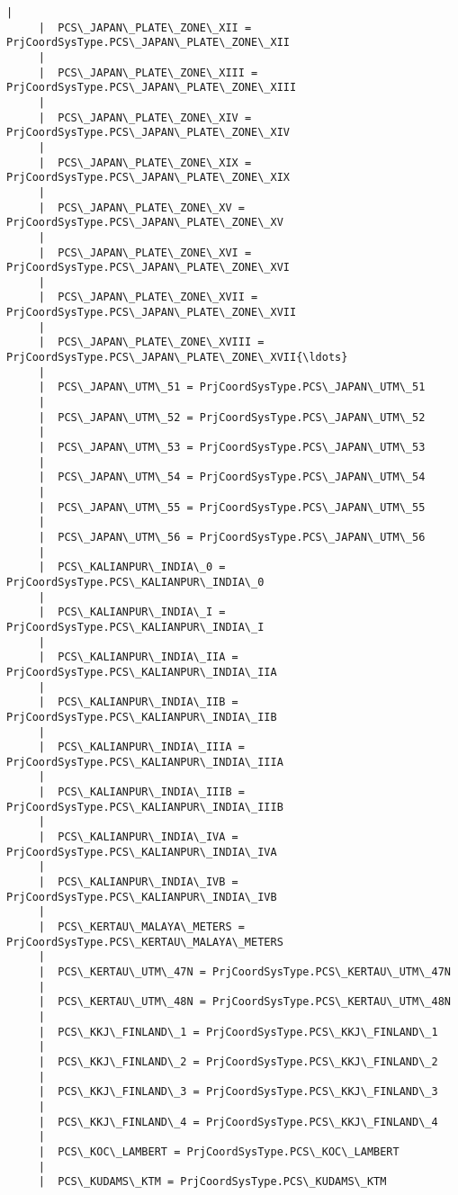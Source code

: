 \documentclass[11pt]{article}
\begin{document}
\begin{Verbatim}[commandchars=\\\{\}]
     |  
     |  PCS\_JAPAN\_PLATE\_ZONE\_XII = PrjCoordSysType.PCS\_JAPAN\_PLATE\_ZONE\_XII
     |  
     |  PCS\_JAPAN\_PLATE\_ZONE\_XIII = PrjCoordSysType.PCS\_JAPAN\_PLATE\_ZONE\_XIII
     |  
     |  PCS\_JAPAN\_PLATE\_ZONE\_XIV = PrjCoordSysType.PCS\_JAPAN\_PLATE\_ZONE\_XIV
     |  
     |  PCS\_JAPAN\_PLATE\_ZONE\_XIX = PrjCoordSysType.PCS\_JAPAN\_PLATE\_ZONE\_XIX
     |  
     |  PCS\_JAPAN\_PLATE\_ZONE\_XV = PrjCoordSysType.PCS\_JAPAN\_PLATE\_ZONE\_XV
     |  
     |  PCS\_JAPAN\_PLATE\_ZONE\_XVI = PrjCoordSysType.PCS\_JAPAN\_PLATE\_ZONE\_XVI
     |  
     |  PCS\_JAPAN\_PLATE\_ZONE\_XVII = PrjCoordSysType.PCS\_JAPAN\_PLATE\_ZONE\_XVII
     |  
     |  PCS\_JAPAN\_PLATE\_ZONE\_XVIII = PrjCoordSysType.PCS\_JAPAN\_PLATE\_ZONE\_XVII{\ldots}
     |  
     |  PCS\_JAPAN\_UTM\_51 = PrjCoordSysType.PCS\_JAPAN\_UTM\_51
     |  
     |  PCS\_JAPAN\_UTM\_52 = PrjCoordSysType.PCS\_JAPAN\_UTM\_52
     |  
     |  PCS\_JAPAN\_UTM\_53 = PrjCoordSysType.PCS\_JAPAN\_UTM\_53
     |  
     |  PCS\_JAPAN\_UTM\_54 = PrjCoordSysType.PCS\_JAPAN\_UTM\_54
     |  
     |  PCS\_JAPAN\_UTM\_55 = PrjCoordSysType.PCS\_JAPAN\_UTM\_55
     |  
     |  PCS\_JAPAN\_UTM\_56 = PrjCoordSysType.PCS\_JAPAN\_UTM\_56
     |  
     |  PCS\_KALIANPUR\_INDIA\_0 = PrjCoordSysType.PCS\_KALIANPUR\_INDIA\_0
     |  
     |  PCS\_KALIANPUR\_INDIA\_I = PrjCoordSysType.PCS\_KALIANPUR\_INDIA\_I
     |  
     |  PCS\_KALIANPUR\_INDIA\_IIA = PrjCoordSysType.PCS\_KALIANPUR\_INDIA\_IIA
     |  
     |  PCS\_KALIANPUR\_INDIA\_IIB = PrjCoordSysType.PCS\_KALIANPUR\_INDIA\_IIB
     |  
     |  PCS\_KALIANPUR\_INDIA\_IIIA = PrjCoordSysType.PCS\_KALIANPUR\_INDIA\_IIIA
     |  
     |  PCS\_KALIANPUR\_INDIA\_IIIB = PrjCoordSysType.PCS\_KALIANPUR\_INDIA\_IIIB
     |  
     |  PCS\_KALIANPUR\_INDIA\_IVA = PrjCoordSysType.PCS\_KALIANPUR\_INDIA\_IVA
     |  
     |  PCS\_KALIANPUR\_INDIA\_IVB = PrjCoordSysType.PCS\_KALIANPUR\_INDIA\_IVB
     |  
     |  PCS\_KERTAU\_MALAYA\_METERS = PrjCoordSysType.PCS\_KERTAU\_MALAYA\_METERS
     |  
     |  PCS\_KERTAU\_UTM\_47N = PrjCoordSysType.PCS\_KERTAU\_UTM\_47N
     |  
     |  PCS\_KERTAU\_UTM\_48N = PrjCoordSysType.PCS\_KERTAU\_UTM\_48N
     |  
     |  PCS\_KKJ\_FINLAND\_1 = PrjCoordSysType.PCS\_KKJ\_FINLAND\_1
     |  
     |  PCS\_KKJ\_FINLAND\_2 = PrjCoordSysType.PCS\_KKJ\_FINLAND\_2
     |  
     |  PCS\_KKJ\_FINLAND\_3 = PrjCoordSysType.PCS\_KKJ\_FINLAND\_3
     |  
     |  PCS\_KKJ\_FINLAND\_4 = PrjCoordSysType.PCS\_KKJ\_FINLAND\_4
     |  
     |  PCS\_KOC\_LAMBERT = PrjCoordSysType.PCS\_KOC\_LAMBERT
     |  
     |  PCS\_KUDAMS\_KTM = PrjCoordSysType.PCS\_KUDAMS\_KTM

\end{Verbatim}
\end{document}
